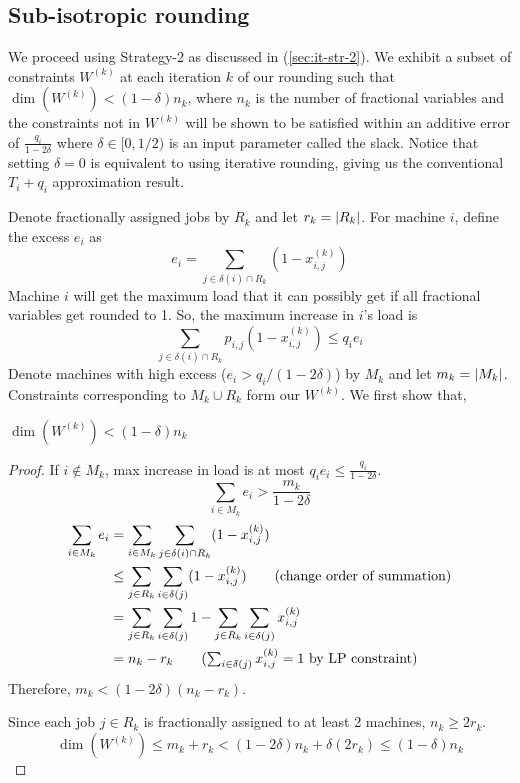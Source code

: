 \subsection{Sub-isotropic rounding}

We proceed using Strategy-2 as discussed in (\ref{sec:it-str-2}).
We exhibit a subset of constraints $W^{(k)}$ at each iteration $k$ of our rounding such that
$\dim(W^{(k)}) < (1-\delta)n_k$, where $n_k$ is the number of fractional variables
and the constraints not in $W^{(k)}$ will be shown to be satisfied
within an additive error of $\frac{q_i}{1-2\delta}$ where $\delta \in [0,1/2)$
is an input parameter called the slack.
Notice that setting $\delta = 0$ is equivalent to using iterative rounding,
giving us the conventional $T_i + q_i$ approximation result.

Denote fractionally assigned jobs by $R_k$ and let $r_k = \left\lvert R_k \right\rvert$.
For machine $i$, define the excess $e_i$ as
\[ e_i = \sum_{j \in \delta(i) \cap R_k} (1 - x_{i,j}^{(k)}) \]
Machine $i$ will get the maximum load that it can possibly get if
all fractional variables get rounded to 1. So, the maximum increase in $i$'s load is
\[ \sum_{j \in \delta(i) \cap R_k} p_{i,j} (1-x_{i,j}^{(k)}) \leq q_i e_i \]
Denote machines with high excess ($e_i > q_i/(1-2\delta)$) by $M_k$ and let $m_k = \left\lvert M_k \right\rvert$.
Constraints corresponding to $M_k \cup R_k$ form our $W^{(k)}$. We first show that,
\begin{lemma}
$\dim(W^{(k)}) < (1-\delta)n_k$
\end{lemma}
\begin{proof}
If $i \not\in M_k$, max increase in load is at most $q_i e_i \le \frac{q_i}{1-2\delta}$.
\[ \sum_{i \in M_k} e_i > \frac{m_k}{1-2\delta} \]
\begin{align*}
\sum_{i \in M_k} e_i
&= \sum_{i \in M_k} \sum_{j \in \delta(i) \cap R_k} (1 - x_{i,j}^{(k)})
\\ &\leq \sum_{j \in R_k} \sum_{i \in \delta(j)} (1 - x_{i,j}^{(k)})  \tag{change order of summation}
\\ &= \sum_{j \in R_k} \sum_{i \in \delta(j)} 1 - \sum_{j \in R_k} \sum_{i \in \delta(j)} x_{i,j}^{(k)}
\\ &= n_k - r_k \tag{$\sum_{i \in \delta(j)} x_{i,j}^{(k)} = 1$ by LP constraint}
\end{align*}
Therefore, $m_k < (1-2\delta)(n_k - r_k)$.

Since each job $j \in R_k$ is fractionally assigned to at least 2 machines, $n_k \geq 2r_k$.
\[ \dim(W^{(k)}) \le m_k + r_k < (1-2\delta)n_k + \delta(2r_k) \le (1-\delta)n_k \]
\end{proof}


